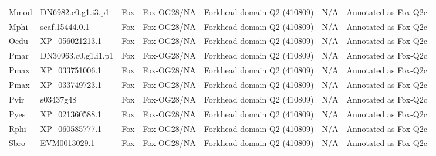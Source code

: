 \documentclass[../main.tex]{subfiles}
\begin{document}
\begin{landscape}
\begin{longtable}{lllllll}
		Mmod           & DN6982.c0.g1.i3.p1    & Fox            & Fox-OG28/NA         & Forkhead domain Q2 (410809)                 & N/A                                                                    & Annotated as Fox-Q2c \\
		Mphi           & scaf.15444.0.1        & Fox            & Fox-OG28/NA         & Forkhead domain Q2 (410809)                 & N/A                                                                    & Annotated as Fox-Q2c \\
		Oedu           & XP\_056021213.1       & Fox            & Fox-OG28/NA         & Forkhead domain Q2 (410809)                 & N/A                                                                    & Annotated as Fox-Q2c \\
		Pmar           & DN30963.c0.g1.i1.p1   & Fox            & Fox-OG28/NA         & Forkhead domain Q2 (410809)                 & N/A                                                                    & Annotated as Fox-Q2c \\
		Pmax           & XP\_033751006.1       & Fox            & Fox-OG28/NA         & Forkhead domain Q2 (410809)                 & N/A                                                                    & Annotated as Fox-Q2c \\
		Pmax           & XP\_033749723.1       & Fox            & Fox-OG28/NA         & Forkhead domain Q2 (410809)                 & N/A                                                                    & Annotated as Fox-Q2c \\
		Pvir           & s03437g48             & Fox            & Fox-OG28/NA         & Forkhead domain Q2 (410809)                 & N/A                                                                    & Annotated as Fox-Q2c \\
		Pyes           & XP\_021360588.1       & Fox            & Fox-OG28/NA         & Forkhead domain Q2 (410809)                 & N/A                                                                    & Annotated as Fox-Q2c \\
		Rphi           & XP\_060585777.1       & Fox            & Fox-OG28/NA         & Forkhead domain Q2 (410809)                 & N/A                                                                    & Annotated as Fox-Q2c \\
		Sbro           & EVM0013029.1          & Fox            & Fox-OG28/NA         & Forkhead domain Q2 (410809)                 & N/A                                                                    & Annotated as Fox-Q2c \\

\end{longtable}
\end{landscape}
\end{document}
